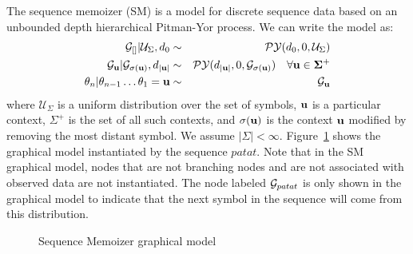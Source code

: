 The sequence memoizer (SM) \cite{Wood2009} is a model for discrete sequence data based on an unbounded depth hierarchical Pitman-Yor process. We can write the model as:
%
\begin{eqnarray*}
	\G_{[]} | \mathcal{U}_{\Sigma}, d_0 &\sim& \PY(d_0, 0, \mathcal{U}_{\Sigma }) \\
	\G_{\bf{u}} | \G_{\sigma(\bf{u})}, d_{|\bf{u}|} &\sim& \PY(d_{|\bf{u}|}, 0, \G_{\sigma(\bf{u})}) \hspace{.35cm} \forall \bf{u} \in \Sigma^+\\
	\theta_n | \theta_{n-1}  \ldots \theta_1 = \bf{u} &\sim& \G_{\bf{u}}
\end{eqnarray*}
%
where $\mathcal{U}_{\Sigma }$ is a uniform distribution over the set of symbols, $\bf{u}$ is a particular context, $\Sigma^+$ is the set of all such contexts, and $\sigma(\bf{u})$ is the context $\bf{u}$ modified by removing the most distant symbol.  We assume $| \Sigma | < \infty$. Figure~\ref{figprefixtree} shows the graphical model instantiated by the sequence $patat$.  Note that in the SM graphical model, nodes that are not branching nodes and are not associated with observed data are not instantiated. The node labeled $\G_{patat}$ is only shown in the graphical model to indicate that the next symbol in the sequence will come from this distribution.
%
\begin{figure}[t] 
	\begin{center}
		\caption{Sequence Memoizer graphical model}
		\label{figprefixtree}
	\end{center} 
\end{figure} 
%

